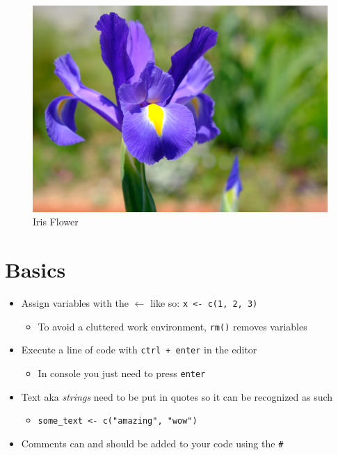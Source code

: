 \documentclass[
]{book}
\providecommand{\tightlist}{%
  \setlength{\itemsep}{0pt}\setlength{\parskip}{0pt}}
\begin{document}
\begin{figure}
\centering
\includegraphics{./img/iris.png}
\caption{Iris Flower}
\end{figure}

\section{Basics}\label{basics}

\begin{itemize}
\tightlist
\item
  Assign variables with the \(\leftarrow\) like so: \newline 
  \texttt{x\ \textless{}-\ c(1,\ 2,\ 3)}

  \begin{itemize}
  \tightlist
  \item
    To avoid a cluttered work environment, \texttt{rm()} removes variables
  \end{itemize}
\item
  Execute a line of code with \texttt{ctrl\ +\ enter} in the editor

  \begin{itemize}
  \tightlist
  \item
    In console you just need to press \texttt{enter}
  \end{itemize}
\item
  Text aka \emph{strings} need to be put in quotes so it can be recognized as such

  \begin{itemize}
  \tightlist
  \item
    \texttt{some\_text\ \textless{}-\ c("amazing",\ "wow")}
  \end{itemize}
\item
  Comments can and should be added to your code using the \texttt{\#}
\end{itemize}
\end{document}

